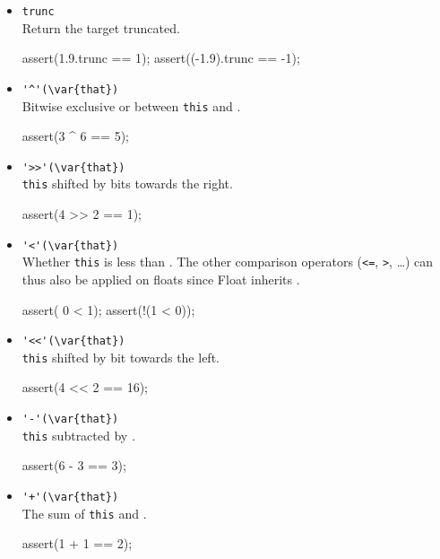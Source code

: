 \begin{itemize}
\item \lstinline|trunc|\\
  Return the target truncated.
\begin{urbiscript}[firstnumber=last]
assert(1.9.trunc == 1);
assert((-1.9).trunc == -1);
\end{urbiscript}

\item \lstinline|'^'(\var{that})|\\
  Bitwise exclusive or between \lstinline|this| and .
\begin{urbiscript}[firstnumber=last]
assert(3 ^ 6 == 5);
\end{urbiscript}

\item \lstinline|'>>'(\var{that})|\\%
  \lstinline|this| shifted by  bits towards the right.
\begin{urbiscript}[firstnumber=last]
assert(4 >> 2 == 1);
\end{urbiscript}

\item \lstinline|'<'(\var{that})|\\
  Whether \lstinline|this| is less than . The other comparison
  operators (\lstinline|<=|, \lstinline|>|, \ldots) can thus also be
  applied on floats since Float inherits .
\begin{urbiscript}[firstnumber=last]
assert(  0 < 1);
assert(!(1 < 0));
\end{urbiscript}

\item \lstinline|'<<'(\var{that})|\\
  \lstinline|this| shifted by  bit towards the left.
\begin{urbiscript}[firstnumber=last]
assert(4 << 2 == 16);
\end{urbiscript}

\item \lstinline|'-'(\var{that})|\\
  \lstinline|this| subtracted by .
\begin{urbiscript}[firstnumber=last]
assert(6 - 3 == 3);
\end{urbiscript}

\item \lstinline|'+'(\var{that})|\\
  The sum of \lstinline|this| and .
\begin{urbiscript}[firstnumber=last]
assert(1 + 1 == 2);
\end{urbiscript}


\end{itemize}
